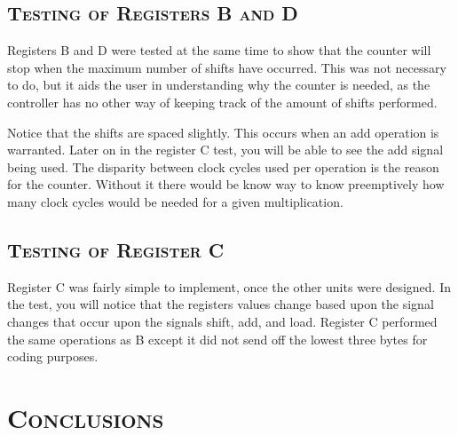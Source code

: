 \documentclass[11pt]{report}
\begin{document}
\begin{spacing}{1.5}
\subsection{\scshape Testing of Registers B and D}
\label{sub:test_counter}

Registers B and D were tested at the same time to show that the counter will stop when the maximum number of shifts have occurred.  This was not necessary to do, but it aids the user in understanding why the counter is needed, as the controller has no other way of keeping track of the amount of shifts performed.


Notice that the shifts are spaced slightly.  This occurs when an add operation is warranted.  Later on in the register C test, you will be able to see the add signal being used.  The disparity between clock cycles used per operation is the reason for the counter.  Without it there would be know way to know preemptively how many clock cycles would be needed for a given multiplication.

\subsection{\scshape Testing of Register C}
\label{sub:design_fsm}

Register C was fairly simple to implement, once the other units were designed.  In the test, you will notice that the registers values change based upon the signal changes that occur upon the signals shift, add, and load.  Register C performed the same operations as B except it did not send off the lowest three bytes for coding purposes.


\clearpage

\section{\scshape Conclusions} %
\label{sec:conclusions}


\end{spacing}
\end{document}
